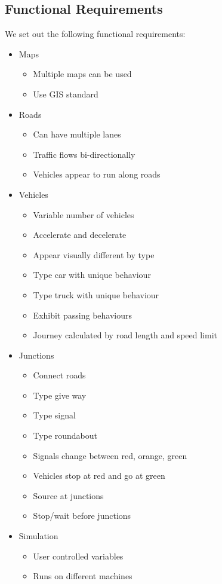 \documentclass[11pt]{article}
\begin{document}
\begin{enumerate}
\subsection{Functional Requirements}

We set out the following functional requirements:

\begin{itemize}\itemsep0pt
\item Maps
	\begin{itemize}
	\item Multiple maps can be used
	\item Use GIS standard
	\end{itemize}
\item Roads 
	\begin{itemize}
	\item Can have multiple lanes
	\item Traffic flows bi-directionally 
	\item Vehicles appear to run along roads
	\end{itemize}
\item Vehicles
	\begin{itemize}
	\item Variable number of vehicles 
	\item Accelerate and decelerate
	\item Appear visually different by type
	\item Type car with unique behaviour
	\item Type truck with unique behaviour
	\item Exhibit passing behaviours
	\item Journey calculated by road length and speed limit
	\end{itemize}
\item Junctions 
	\begin{itemize}
	\item Connect roads
	\item Type give way
	\item Type signal
	\item Type roundabout
	\item Signals change between red, orange, green
	\item Vehicles stop at red and go at green
	\item Source at junctions
	\item Stop/wait before junctions
	\end{itemize}
\item Simulation 
	\begin{itemize}
	\item User controlled variables
	\item Runs on different machines
	\end{itemize}
\end{itemize}


\end{enumerate}
\end{document}
